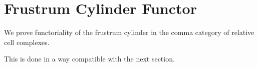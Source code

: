 \section{Frustrum Cylinder Functor} \label{sec: frustrum cylinder functor}

We prove functoriality of the frustrum cylinder in the comma category of relative cell complexes.

This is done in a way compatible with the next section.

